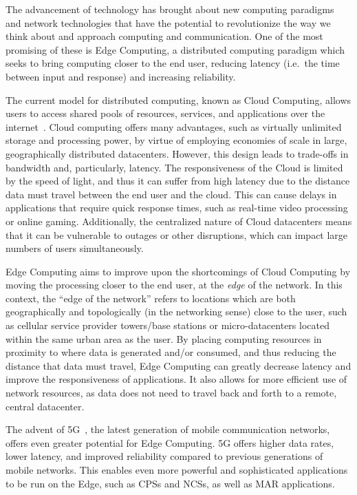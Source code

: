 The advancement of technology has brought about new computing paradigms and network technologies that have the potential to revolutionize the way we think about and approach computing and communication.
One of the most promising of these is Edge Computing, a distributed computing paradigm which seeks to bring computing closer to the end user, reducing latency (i.e.\ the time between input and response) and increasing reliability.

The current model for distributed computing, known as Cloud Computing, allows users to access shared pools of resources, services, and applications over the internet~\cite{gai2012towards}.
Cloud computing offers many advantages, such as virtually unlimited storage and processing power, by virtue of employing economies of scale in large, geographically distributed datacenters.
However, this design leads to trade-offs in bandwidth and, particularly, latency.
The responsiveness of the Cloud is limited by the speed of light, and thus it can suffer from high latency due to the distance data must travel between the end user and the cloud.
This can cause delays in applications that require quick response times, such as real-time video processing or online gaming.
Additionally, the centralized nature of Cloud datacenters means that it can be vulnerable to outages or other disruptions, which can impact large numbers of users simultaneously.

Edge Computing aims to improve upon the shortcomings of Cloud Computing by moving the processing closer to the end user, at the \emph{edge} of the network.
In this context, the ``edge of the network'' refers to locations which are both geographically and topologically (in the networking sense) close to the user, such as cellular service provider towers/base stations or micro-datacenters located within the same urban area as the user.
By placing computing resources in proximity to where data is generated and/or consumed, and thus reducing the distance that data must travel, Edge Computing can greatly decrease latency and improve the responsiveness of applications.
It also allows for more efficient use of network resources, as data does not need to travel back and forth to a remote, central datacenter.

The advent of 5G~\cite{5Gstandard}, the latest generation of mobile communication networks, offers even greater potential for Edge Computing.
5G offers higher data rates, lower latency, and improved reliability compared to previous generations of mobile networks.
This enables even more powerful and sophisticated applications to be run on the Edge, such as \acsp{CPS} and \acsp{NCS}, as well as \acs{MAR} applications.

